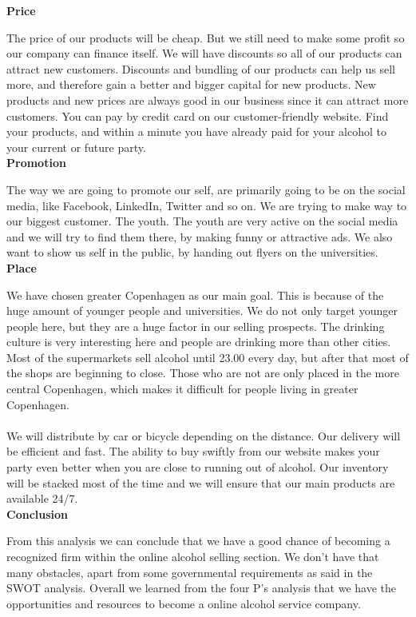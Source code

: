 \documentclass[12p]{article}
\begin{document}
\textbf{Price}

The price of our products will be cheap. But we still need to make some profit so our company can finance itself. We will have discounts so all of our products can attract new customers. Discounts and bundling of our products can help us sell more, and therefore gain a better and bigger capital for new products. New products and new prices are always good in our business since it can attract more customers. You can pay by credit card on our customer-friendly website. Find your products, and within a minute you have already paid for your alcohol to your current or future party.  \\

\textbf{Promotion}

The way we are going to promote our self, are primarily going to be on the social media, like Facebook, LinkedIn, Twitter and so on. We are trying to make way to our biggest customer. The youth. The youth are very active on the social media and we will try to find them there, by making funny or attractive ads. We also want to show us self in the public, by handing out flyers on the universities. \\


\textbf{Place}

We have chosen greater Copenhagen as our main goal. This is because of the huge amount of younger people and universities. We do not only target younger people here, but they are a huge factor in our selling prospects.
The drinking culture is very interesting here and people are drinking more than other cities. Most of the supermarkets sell alcohol until 23.00 every day, but after that most of the shops are beginning to close. Those who are not are only placed in the more central Copenhagen, which makes it difficult for people living in greater Copenhagen. 
\\ \\
We will distribute by car or bicycle depending on the distance. Our delivery will be efficient and fast. The ability to buy swiftly from our website makes your party even better when you are close to running out of alcohol. Our inventory will be stacked most of the time and we will ensure that our main products are available 24/7. \\

\textbf{Conclusion}

From this analysis we can conclude that we have a good chance of becoming a recognized firm within the online alcohol selling section. We don't have that many obstacles, apart from some governmental requirements as said in the SWOT analysis. Overall we learned from the four P's analysis that we have the opportunities and resources to become a online alcohol service company.
\end{document}

